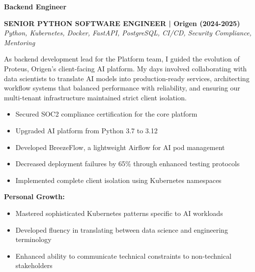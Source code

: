 \documentclass[a4paper,10pt]{article}
\begin{document}



\vspace{0.5cm}
\noindent
\colorbox{leadershipbg}{%
	\begin{minipage}{\dimexpr\textwidth-2\fboxsep\relax}
		\vspace{0.2cm}

		{\large\bfseries\color{darkblue}\selectfont Backend Engineer}
		\vspace{0.3cm}

		\noindent\textbf{SENIOR PYTHON SOFTWARE ENGINEER | Origen (2024-2025)} \\
		\vspace{0.1cm}
		{\small\textit{Python, Kubernetes, Docker, FastAPI, PostgreSQL, CI/CD, Security Compliance, Mentoring}}
		\vspace{0.2cm}

		As backend development lead for the Platform team, I guided the evolution of Proteus, Origen's client-facing AI platform. My days involved collaborating with data scientists to translate AI models into production-ready services, architecting workflow systems that balanced performance with reliability, and ensuring our multi-tenant infrastructure maintained strict client isolation.

		\vspace{0.2cm}
		\begin{itemize}[label=\textcolor{darkblue}{\textbullet}, leftmargin=*, nosep]
			\item Secured SOC2 compliance certification for the core platform
			\item Upgraded AI platform from Python 3.7 to 3.12
			\item Developed BreezeFlow, a lightweight Airflow for AI pod management
			\item Decreased deployment failures by 65\% through enhanced testing protocols
			\item Implemented complete client isolation using Kubernetes namespaces
		\end{itemize}

		\vspace{0.2cm}
		\textbf{Personal Growth:}
		\vspace{0.2cm}
		\begin{itemize}[label=\textcolor{darkblue}{\textbullet}, leftmargin=*, nosep]
			\item Mastered sophisticated Kubernetes patterns specific to AI workloads
			\item Developed fluency in translating between data science and engineering terminology
			\item Enhanced ability to communicate technical constraints to non-technical stakeholders
		\end{itemize}


\end{minipage}}
\end{document}
